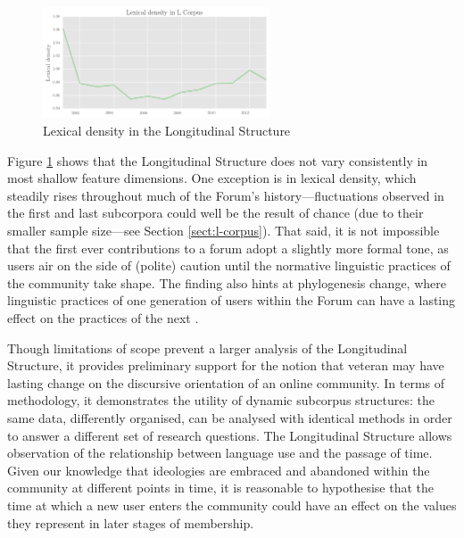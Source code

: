 \begin{figure}[htb]
\centering
\includegraphics[width=0.6\textwidth]{../images/lexical-density-in-l-corpus.png}
\caption{Lexical density in the Longitudinal Structure}
\label{fig:lex_dens_L}
\end{figure}

Figure \ref{fig:lex_dens_L} shows that the Longitudinal Structure does not vary consistently in most shallow feature dimensions. One exception is in lexical density, which steadily rises throughout much of the \gls{Forum}'s history---fluctuations observed in the first and last subcorpora could well be the result of chance (due to their smaller sample size---see Section \ref{sect:l-corpus}). That said, it is not impossible that the first ever contributions to a \gls{forum} adopt a slightly more formal tone, as users air on the side of (polite) caution until the normative linguistic practices of the community take shape. The finding also hints at phylogenesis change, where linguistic practices of one generation of users within the \gls{Forum} can have a lasting effect on the practices of the next \cite{danescu-niculescu-mizil_no_2013}.

Though limitations of scope prevent a larger analysis of the Longitudinal Structure, it provides preliminary support for the notion that veteran  may have lasting change on the discursive orientation of an online community. In terms of methodology, it demonstrates the utility of dynamic subcorpus structures: the same data, differently organised, can be analysed with identical methods in order to answer a different set of research questions. The Longitudinal Structure allows observation of the relationship between language use and the passage of time. Given our knowledge that ideologies are embraced and abandoned within the community at different points in time, it is reasonable to hypothesise that the time at which a new user enters the community could have an effect on the values they represent in later stages of membership. 

